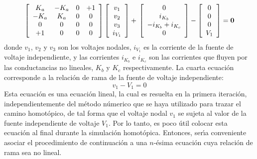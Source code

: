 \documentclass[conference,letterpaper,onecolumn]{IEEEtran}
\newcommand{\pig}[1]{\mbox{\boldmath ${#1}$}	}
\begin{document}
{%
\begin{equation}
\left[ \begin{array}{cccc}
K_a  & -K_a & 0 & +1\\
-K_a & K_a  & 0 & 0 \\
0   & 0    & 0 & 0 \\
+1   & 0    & 0 & 0 
\end{array} \right]
\left[ \begin{array}{c}
v_1\\ v_2\\ v_3\\ i_{V_1}
\end{array} \right]
+ \newline \\
\left[ \begin{array}{c}
0\\ i_{K_b}\\-i_{K_b}+i_{K_c} \\ 0 \end{array} \right]
-
\left[ \begin{array}{c}
0\\ 0\\ 0\\V_1 \end{array} \right]
= \pig{0}
\label{eqsimple}
\end{equation}}
donde $v_1$, $v_2$ y $v_3$  son los voltajes nodales,
$i_{V_1}$ es la corriente de la fuente de voltaje independiente, y
las corrientes $i_{K_b}$ e $i_{K_c}$ son las corrientes que fluyen
por las conductancias no lineales, $K_b$ y $K_c$ respectivamente. 
La cuarta ecuaci\'on  corresponde a la relaci\'on
de rama de la fuente de voltaje independiente:
\begin{displaymath}
v_1-V_1=0
\end{displaymath}
Esta ecuaci\'on es una ecuaci\'on lineal, la cual es resuelta en la
primera i\-te\-ra\-ci\'on, independientemente del m\'etodo n\'umerico que se
haya utilizado para trazar el camino homot\'opico, de tal forma que el
voltaje nodal $v_1$ se sujeta al valor de la fuente independiente de
voltaje $V_1$.
Por lo tanto, es poco \'util colocar esta ecuaci\'on al final durante la simulaci\'on homot\'opica.
Entonces, ser\'{\i}a conveniente asociar el procedimiento de continuaci\'on
a una $n$-\'esima ecuaci\'on cuya relaci\'on de rama sea no lineal.
\end{document}
